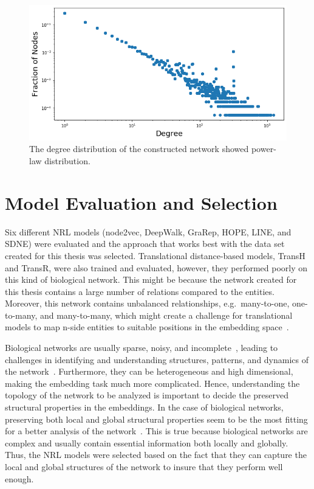 \begin{figure}[h!]
    \centering
    \includegraphics[scale=0.5]
    {figures/degree_distribution.png}
    \caption[Degree distribution of network]{\label{fig:degree_distribution}The degree distribution of the constructed network showed power-law distribution.}
\end{figure}

\section{Model Evaluation and Selection}

Six different \ac{NRL} models (node2vec, DeepWalk, \ac{GraRep}, \ac{HOPE}, \ac{LINE}, and \ac{SDNE}) were evaluated and the approach that works best with the data set created for this thesis was selected.
Translational distance-based models, TransH and TransR, were also trained and evaluated, however, they performed poorly on this kind of biological network.
This might be because the network created for this thesis contains a large number of relations compared to the entities.
Moreover, this network contains unbalanced relationships, e.g.\ many-to-one, one-to-many, and many-to-many, which might create a challenge for translational models to map n-side entities to suitable positions in the embedding space~\cite{liang_predicting_2019}.

Biological networks are usually sparse, noisy, and incomplete~\cite{nickel_review_2016}, leading to challenges in identifying and understanding structures, patterns, and dynamics of the network~\cite{wang_unsupervised_2016}.
Furthermore, they can be heterogeneous and high dimensional, making the embedding task much more complicated.
Hence, understanding the topology of the network to be analyzed is important to decide the preserved structural properties in the embeddings.
In the case of biological networks, preserving both local and global structural properties seem to be the most fitting for a better analysis of the network~\cite{su_network_2018}.
This is true because biological networks are complex and usually contain essential information both locally and globally.
Thus, the \ac{NRL} models were selected based on the fact that they can capture the local and global structures of the network to insure that they perform well enough.

